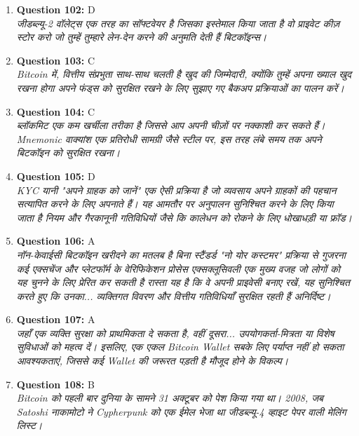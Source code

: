 \documentclass[12pt,a4paper]{article}
\begin{document}
\begin{enumerate}
\item \textbf{Question 102:} D
\\ \textit{जीडब्ल्यू-2 वॉलेट्स एक तरह का सॉफ्टवेयर है जिसका इस्तेमाल किया जाता है वो प्राइवेट कीज़ स्टोर करो जो तुम्हें तुम्हारे लेन-देन करने की अनुमति देती हैं बिटकॉइन्स।}

\item \textbf{Question 103:} C
\\ \textit{Bitcoin में, वित्तीय संप्रभुता साथ-साथ चलती है खुद की जिम्मेदारी, क्योंकि तुम्हें अपना ख्याल खुद रखना होगा अपने फंड्स को सुरक्षित रखने के लिए सुझाए गए बैकअप प्रक्रियाओं का पालन करें।}

\item \textbf{Question 104:} C
\\ \textit{ब्लॉकमिट एक कम खर्चीला तरीका है जिससे आप अपनी चीज़ों पर नक्काशी कर सकते हैं। Mnemonic वाक्यांश एक प्रतिरोधी सामग्री जैसे स्टील पर, इस तरह लंबे समय तक अपने बिटकॉइन को सुरक्षित रखना।}

\item \textbf{Question 105:} D
\\ \textit{KYC यानी "अपने ग्राहक को जानें" एक ऐसी प्रक्रिया है जो व्यवसाय अपने ग्राहकों की पहचान सत्यापित करने के लिए अपनाते हैं। यह आमतौर पर अनुपालन सुनिश्चित करने के लिए किया जाता है नियम और गैरकानूनी गतिविधियों जैसे कि कालेधन को रोकने के लिए धोखाधड़ी या फ्रॉड।}

\item \textbf{Question 106:} A
\\ \textit{नॉन-केवाईसी बिटकॉइन खरीदने का मतलब है बिना स्टैंडर्ड "नो योर कस्टमर" प्रक्रिया से गुजरना कई एक्सचेंज और प्लेटफॉर्म के वेरिफिकेशन प्रोसेस एक्सक्लूसिवली एक मुख्य वजह जो लोगों को यह चुनने के लिए प्रेरित कर सकती है रास्ता यह है कि वे अपनी प्राइवेसी बनाए रखें, यह सुनिश्चित करते हुए कि उनका... व्यक्तिगत विवरण और वित्तीय गतिविधियाँ सुरक्षित रहती हैं अनिर्दिष्ट।}

\item \textbf{Question 107:} A
\\ \textit{जहाँ एक व्यक्ति सुरक्षा को प्राथमिकता दे सकता है, वहीं दूसरा... उपयोगकर्ता-मित्रता या विशेष सुविधाओं को महत्व दें। इसलिए, एक एकल Bitcoin Wallet सबके लिए पर्याप्त नहीं हो सकता आवश्यकताएं, जिससे कई Wallet की जरूरत पड़ती है मौजूद होने के विकल्प।}

\item \textbf{Question 108:} B
\\ \textit{Bitcoin को पहली बार दुनिया के सामने 31 अक्टूबर को पेश किया गया था। 2008, जब Satoshi नाकामोटो ने Cypherpunk को एक ईमेल भेजा था जीडब्ल्यू-4 व्हाइट पेपर वाली मेलिंग लिस्ट।}


\end{enumerate}
\end{document}

